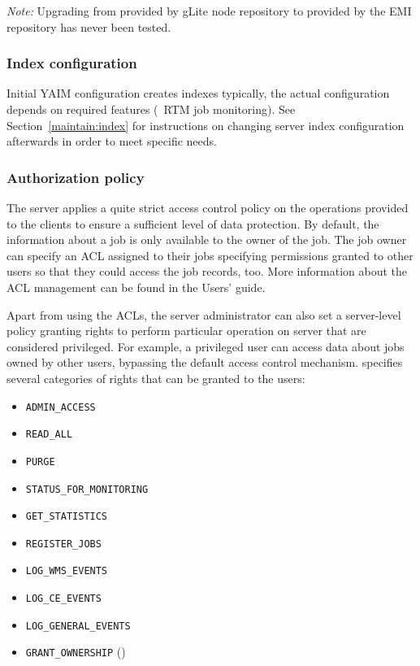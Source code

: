 \emph{Note:} Upgrading from  provided by gLite \LB node repository to  provided by the EMI repository has never been tested.


\subsubsection{Index configuration}

Initial YAIM configuration creates \LB indexes typically,
the actual configuration depends on required features (\eg\ RTM job monitoring).
See Section~\ref{maintain:index} for instructions
on changing \LB server index configuration afterwards in order
to meet specific needs.

\subsubsection{Authorization policy}
\label{inst:authz}
The \LB server applies a quite strict access control policy on the
operations provided to the clients to ensure a sufficient level of data
protection. By default, the information about a job is only available to the
owner of the job. The job owner can specify an ACL assigned to their jobs
specifying permissions granted to other users so that they could access the
job records, too. More information about the ACL management can be found in
the \LB Users' guide.

Apart from using the ACLs, the \LB server administrator can also set a
server-level policy granting rights to perform particular operation on \LB
server that are considered privileged.
For example, a privileged
user can access data about jobs owned by other users, bypassing the default
\LB access control mechanism.  specifies several categories of
rights that can be granted to the users:

\begin{itemize}
\item \verb'ADMIN_ACCESS'
\item \verb'READ_ALL'
\item \verb'PURGE'
\item \verb'STATUS_FOR_MONITORING'
\item \verb'GET_STATISTICS'
\item \verb'REGISTER_JOBS'
\item \verb'LOG_WMS_EVENTS'
\item \verb'LOG_CE_EVENTS'
\item \verb'LOG_GENERAL_EVENTS'
\item \verb'GRANT_OWNERSHIP' ()
\end{itemize}

